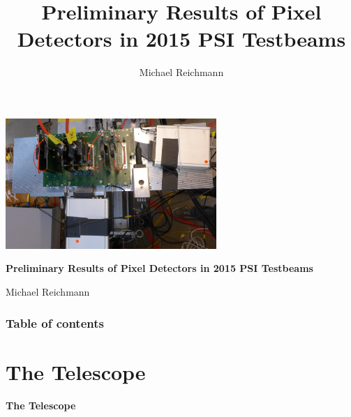 \documentclass[9pt]{beamer}
\title[Pixel Detectors]{Preliminary Results of Pixel Detectors in 2015 PSI Testbeams}
\author[M. Reichmann]{Michael Reichmann}
\institute[\textbf{\textit{ETH}}\scalebox{.6}{\textit{Z\"{u}rich}}]{Swiss Federal Institute of Technology Zurich}
\begin{document}
\begin{frame}
	\begin{center}
		\includegraphics[width=8cm]{Pics/setupfull}
	\end{center}
	\begin{alertblock}{
		\begin{center}
			\textbf{Preliminary Results of Pixel Detectors in 2015 PSI Testbeams}
		\end{center}}
		\vspace*{10pt}
		\begin{center}\small
		Michael Reichmann
		\end{center}\normalsize
	\end{alertblock}
\end{frame}
\begin{frame}%
	\frametitle{Table of contents}
	\tableofcontents   %
\end{frame}
\section{The Telescope}
\begin{frame}
	\begin{alertblock}{
		\begin{center}
			\Large{\textbf{The Telescope}}
		\end{center}}
	\end{alertblock}
\end{frame}
\end{document}
